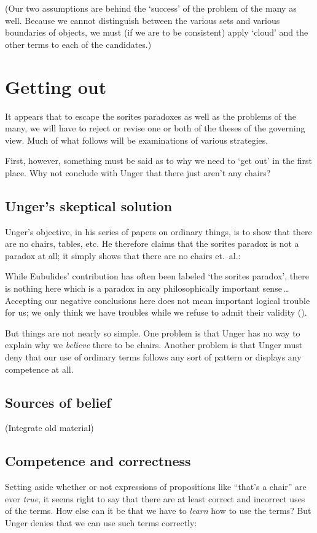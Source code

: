 \documentclass[11pt]{article}
\newenvironment{squote}{%
\begin{spacing}{1}
       	\begin{list}{}{%
\setlength{\labelwidth}{0pt}%
\rightmargin\leftmargin%
}
\item\relax
}{%
\end{list}%
\end{spacing}
}
\begin{document}
\begin{spacing}{1.5}
(Our two assumptions are behind the `success' of the problem of the
many as well.  Because we cannot distinguish between the various sets
and various boundaries of objects, we must (if we are to be
consistent) apply `cloud' and the other terms to each of the
candidates.)

\section{Getting out}
It appears that to escape the sorites paradoxes as well as the
problems of the many, we will have to reject or revise one or both of
the theses of the governing view.  Much of what follows will be
examinations of various strategies.

First, however, something must be said as to why we need to `get out'
in the first place.  Why not conclude with Unger that there just
aren't any chairs?

\subsection{Unger's skeptical solution}
Unger's objective, in his series of papers on ordinary things, is to
show that there are no chairs, tables, etc.  He therefore claims that
the sorites paradox is not a paradox at all; it simply shows that
there are no chairs et.\ al.:

\begin{squote}
While Eubulides' contribution has often been labeled `the sorites
paradox', there is nothing here which is a paradox in any
philosophically important sense\,\ldots\,Accepting our negative
conclusions here does not mean important logical trouble for us; we
only think we have troubles while we refuse to admit their validity
(\citeyear[145]{unger1979}).
\end{squote}

But things are not nearly so simple.  One problem is that Unger has no
way to explain why we \emph{believe} there to be chairs.  Another
problem is that Unger must deny that our use of ordinary terms follows
any sort of pattern or displays any competence at all.

\subsection{Sources of belief}
(Integrate old material)

\subsection{Competence and correctness}
Setting aside whether or not expressions of propositions like ``that's
a chair'' are ever \emph{true}, it seems right to say that there are at
least correct and incorrect uses of the terms.  How else can it be
that we have to \emph{learn} how to use the terms?  But Unger denies that
we can use such terms correctly:


\end{spacing}
\end{document}
